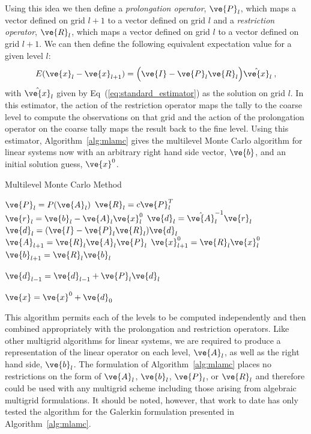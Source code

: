 \documentclass[note]{TechNote}
\begin{document}
Using this idea we then define a \textit{prolongation operator},
$\ve{P}_l$, which maps a vector defined on grid $l+1$ to a
vector defined on grid $l$ and a \textit{restriction operator},
$\ve{R}_l$, which maps a vector defined on grid $l$ to a
vector defined on grid $l+1$. We can then define the following
equivalent expectation value for a given level $l$:
\begin{equation}
  E(\ve{x}_{l} - \ve{x}_{l+1}) = \Big(\ve{I} - \ve{P}_l
  \ve{R}_l\Big) \hat{\ve{x}}_{l}\:,
  \label{eq:level_expectation}
\end{equation}
with $\hat{\ve{x}}_{l}$ given by Eq~(\ref{eq:standard_estimator}) as
the solution on grid $l$. In this estimator, the action of the
restriction operator maps the tally to the coarse level to compute the
observations on that grid and the action of the prolongation operator
on the coarse tally maps the result back to the fine level. Using this
estimator, Algorithm~\ref{alg:mlamc} gives the multilevel Monte Carlo
algorithm for linear systems now with an arbitrary right hand side
vector, $\ve{b}$, and an initial solution guess, $\ve{x}^0$.
\begin{algorithm}[h!]
  \caption{Multilevel Monte Carlo Method}
  \label{alg:mlamc}
  \begin{algorithmic}[1]
    \State $\ve{P}_l = P(\ve{A}_l)$
    \State $\ve{R}_l = c \ve{P}_l^T$
    \State $\ve{r}_l = \ve{b}_l - \ve{A}_l \ve{x}_l^0$
    \State $\ve{d}_l = \hat{\ve{A}}_l^{-1} \ve{r}_l$
    \State $\ve{d}_l = (\ve{I} - \ve{P}_l\ve{R}_l) \ve{d}_{l}$
    \State $\ve{A}_{l+1} = \ve{R}_l \ve{A}_l \ve{P}_l$
    \State $\ve{x}_{l+1}^0 = \ve{R}_l \ve{x}_l^0$
    \State $\ve{b}_{l+1} = \ve{R}_l \ve{b}_l$
    \EndIf
    \EndFor

    \State $\ve{d}_{l-1} = \ve{d}_{l-1} + \ve{P}_{l} \ve{d}_{l}$
    \EndFor

    \State $\ve{x} = \ve{x}^0 + \ve{d}_0$

  \end{algorithmic}
\end{algorithm}
This algorithm permits each of the levels to be computed independently
and then combined appropriately with the prolongation and restriction
operators. Like other multigrid algorithms for linear systems, we are
required to produce a representation of the linear operator on each
level, $\ve{A}_l$, as well as the right hand side, $\ve{b}_l$. The
formulation of Algorithm~\ref{alg:mlamc} places no restrictions on the
form of $\ve{A}_l$, $\ve{b}_l$, $\ve{P}_l$, or $\ve{R}_l$
and therefore could be used with any multigrid scheme including those
arising from algebraic multigrid formulations. It should be noted,
however, that work to date has only tested the algorithm for the
Galerkin formulation presented in Algorithm~\ref{alg:mlamc}.
\end{document}

